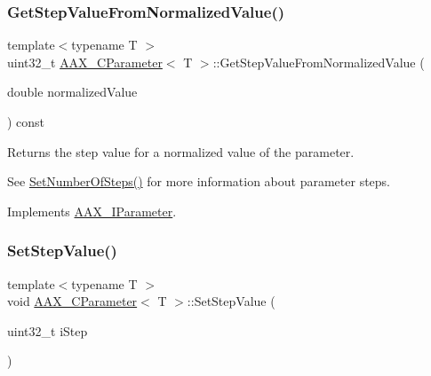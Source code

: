 \mbox{\label{a01537_ab6b9451a0dee2caa12829b1e7fca856b}} 
\subsubsection{\texorpdfstring{GetStepValueFromNormalizedValue()}{GetStepValueFromNormalizedValue()}}
{\footnotesize\ttfamily template$<$typename T $>$ \\
uint32\+\_\+t \mbox{\hyperlink{a01537}{A\+A\+X\+\_\+\+C\+Parameter}}$<$ T $>$\+::Get\+Step\+Value\+From\+Normalized\+Value (\begin{DoxyParamCaption}\item[{double}]{normalized\+Value }\end{DoxyParamCaption}) const\hspace{0.3cm}{\ttfamily [virtual]}}



Returns the step value for a normalized value of the parameter. 

See \mbox{\hyperlink{a01537_ac1c0ee92affe0379a58411955d27bb2b}{Set\+Number\+Of\+Steps()}} for more information about parameter steps. 

Implements \mbox{\hyperlink{a01857_a5ff847bf1730bda6c91189aba8969557}{A\+A\+X\+\_\+\+I\+Parameter}}.

\mbox{\label{a01537_a832da5dbb22198976ca7f060b13a6406}} 
\subsubsection{\texorpdfstring{SetStepValue()}{SetStepValue()}}
{\footnotesize\ttfamily template$<$typename T $>$ \\
void \mbox{\hyperlink{a01537}{A\+A\+X\+\_\+\+C\+Parameter}}$<$ T $>$\+::Set\+Step\+Value (\begin{DoxyParamCaption}\item[{uint32\+\_\+t}]{i\+Step }\end{DoxyParamCaption})\hspace{0.3cm}{\ttfamily [virtual]}}



